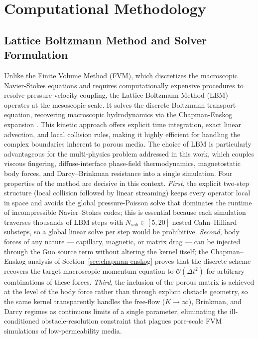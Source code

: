 \section{Computational Methodology}

\subsection{Lattice Boltzmann Method and Solver Formulation}
Unlike the Finite Volume Method (FVM), which discretizes the macroscopic Navier-Stokes equations and requires computationally expensive procedures to resolve pressure-velocity coupling, the Lattice Boltzmann Method (LBM) operates at the mesoscopic scale.
It solves the discrete Boltzmann transport equation, recovering macroscopic hydrodynamics via the Chapman-Enskog expansion \cite{chen1998lattice}.
This kinetic approach offers explicit time integration, exact linear advection, and local collision rules, making it highly efficient for handling the complex boundaries inherent to porous media.
The choice of LBM is particularly advantageous for the multi-physics problem addressed in this work, which couples viscous fingering, diffuse-interface phase-field thermodynamics, magnetostatic body forces, and Darcy--Brinkman resistance into a single simulation.
Four properties of the method are decisive in this context.
\emph{First}, the explicit two-step structure (local collision followed by linear streaming) keeps every operator local in space and avoids the global pressure-Poisson solve that dominates the runtime of incompressible Navier--Stokes codes;
this is essential because each simulation traverses thousands of LBM steps with $N_{sub} \in [5,20]$ nested Cahn--Hilliard substeps, so a global linear solve per step would be prohibitive.
\emph{Second}, body forces of any nature --- capillary, magnetic, or matrix drag --- can be injected through the Guo source term \cite{guo2002discrete} without altering the kernel itself;
the Chapman--Enskog analysis of Section~\ref{sec:chapman-enskog} proves that the discrete scheme recovers the target macroscopic momentum equation to $\mathcal{O}(\Delta t^{2})$ for arbitrary combinations of these forces.
\emph{Third}, the inclusion of the porous matrix is achieved at the level of the body force rather than through explicit obstacle geometry, so the same kernel transparently handles the free-flow ($K \to \infty$), Brinkman, and Darcy regimes as continuous limits of a single parameter, eliminating the ill-conditioned obstacle-resolution constraint that plagues pore-scale FVM simulations of low-permeability media.
